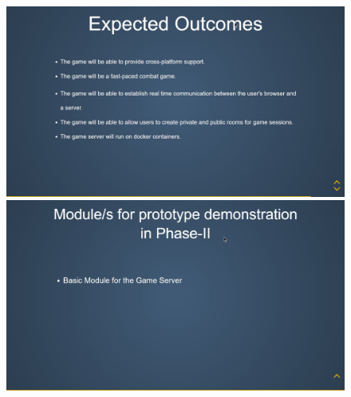 \documentclass[oneside,12pt]{Classes/VTU}
\begin{document}
	\begin{figure}[ht!]
		\centering
		\includegraphics[scale=0.25]{s10.jpg}
		\includegraphics[scale=0.25]{s11.jpg}
	\end{figure}

\pagebreak

\end{document}
